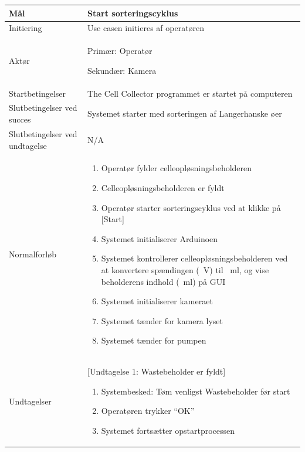 \label{uc:1}
\begin{center}
		\begin{longtable}{ | m{4cm} | m{8cm}| } 
			\hline
			Mål & Start sorteringscyklus \\ 
			\hline
			Initiering &  Use casen initieres af operatøren\\
			\hline
			Aktør & 
			Primær: Operatør
			
			 Sekundær: Kamera			  \\ 
			\hline
			Startbetingelser & The Cell Collector programmet er startet på computeren \\ 
			\hline	
			Slutbetingelser ved succes & Systemet starter med sorteringen af Langerhanske øer \\
			\hline
			Slutbetingelser ved undtagelse & N/A \\
			\hline
			Normalforløb & \begin{enumerate}
				\item Operatør fylder celleopløsningsbeholderen
				\item Celleopløsningsbeholderen er fyldt
				\item Operatør starter sorteringscyklus ved at klikke på [Start]
				\subitem [Undtagelse 1: Wastebeholder er fyldt] 
				\item Systemet initialiserer Arduinoen
				\subitem [Undtagelse 2: Ingen forbindelse til Arduino]
				\item Systemet kontrollerer celleopløsningsbeholderen ved at konvertere spændingen (\SI{}{\volt})  til \SI{}{\milli\litre}, og vise beholderens indhold (\SI{}{\milli\litre}) på GUI
				\item Systemet initialiserer kameraet
				\subitem [Undtagelse 3: Kameraet initialiserer ikke]
				\item Systemet tænder for kamera lyset
				\item Systemet tænder for pumpen
				
			\end{enumerate} \\ 
			\hline
			Undtagelser & [Undtagelse 1: Wastebeholder er fyldt] 
			
			\begin{enumerate}
			\item Systembesked: Tøm venligst Wastebeholder før start
			\item Operatøren trykker “OK”
			\item Systemet fortsætter opstartprocessen
			\end{enumerate} 
			

\end{longtable}
\end{center}
